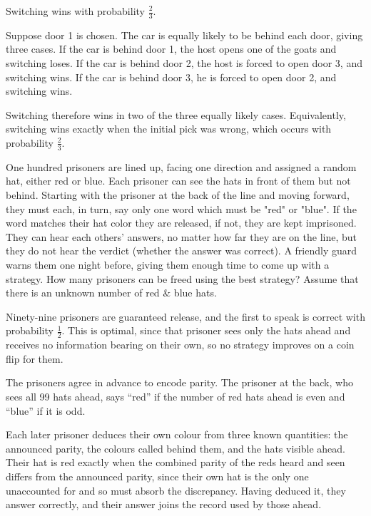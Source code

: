 \begin{solution}
Switching wins with probability $\frac{2}{3}$.

Suppose door 1 is chosen. The car is equally likely to be behind each door, giving three cases. If the car is behind door 1, the host opens one of the goats and switching loses. If the car is behind door 2, the host is forced to open door 3, and switching wins. If the car is behind door 3, he is forced to open door 2, and switching wins.

Switching therefore wins in two of the three equally likely cases. Equivalently, switching wins exactly when the initial pick was wrong, which occurs with probability $\frac{2}{3}$.
\end{solution}

\newpage

\begin{problem}
One hundred prisoners are lined up, facing one direction and assigned a random hat, either red or blue. Each prisoner can see the hats in front of them but not behind. Starting with the prisoner at the back of the line and moving forward, they must each, in turn, say only one word which must be "red" or "blue". If the word matches their hat color they are released, if not, they are kept imprisoned. They can hear each others' answers, no matter how far they are on the line, but they do not hear the verdict (whether the answer was correct). A friendly guard warns them one night before, giving them enough time to come up with a strategy. How many prisoners can be freed using the best strategy? Assume that there is an unknown number of red \& blue hats.
\end{problem}

\begin{solution}
Ninety-nine prisoners are guaranteed release, and the first to speak is correct with probability $\frac{1}{2}$. This is optimal, since that prisoner sees only the hats ahead and receives no information bearing on their own, so no strategy improves on a coin flip for them.

The prisoners agree in advance to encode parity. The prisoner at the back, who sees all 99 hats ahead, says ``red'' if the number of red hats ahead is even and ``blue'' if it is odd.

Each later prisoner deduces their own colour from three known quantities: the announced parity, the colours called behind them, and the hats visible ahead. Their hat is red exactly when the combined parity of the reds heard and seen differs from the announced parity, since their own hat is the only one unaccounted for and so must absorb the discrepancy. Having deduced it, they answer correctly, and their answer joins the record used by those ahead.
\end{solution}



